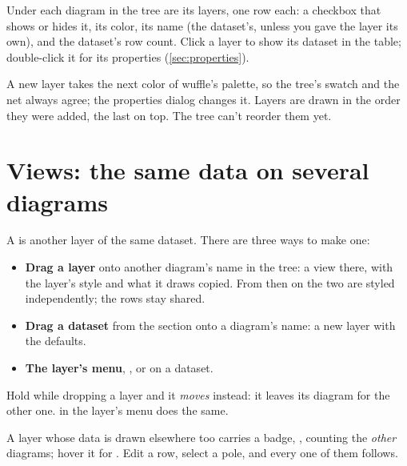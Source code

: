 Under each diagram in the tree are its layers, one row each: a checkbox that shows or hides it, its
color, its name (the dataset's, unless you gave the layer its own), and the dataset's row count. Click a
layer to show its dataset in the table; double-click it for its properties (\cref{sec:properties}).

A new layer takes the next color of wuffle's palette, so the tree's swatch and the net always agree; the
properties dialog changes it. Layers are drawn in the order they were added, the last on top. The tree
can't reorder them yet.

\section{Views: the same data on several diagrams}\label{sec:views}


A  is another layer of the same dataset. There are three ways to make one:

\begin{itemize}
\item \textbf{Drag a layer} onto another diagram's name in the tree: a view there, with the layer's style
and what it draws copied. From then on the two are styled independently; the rows stay shared.
\item \textbf{Drag a dataset} from the  section onto a diagram's name: a new layer with the
defaults.
\item \textbf{The layer's menu}, , or  on a dataset.
\end{itemize}

Hold  while dropping a layer and it \emph{moves} instead: it leaves its diagram for the other
one.  in the layer's menu does the same.

A layer whose data is drawn elsewhere too carries a badge, , counting the \emph{other} diagrams;
hover it for . Edit a row, select a pole, and every one
of them follows.

